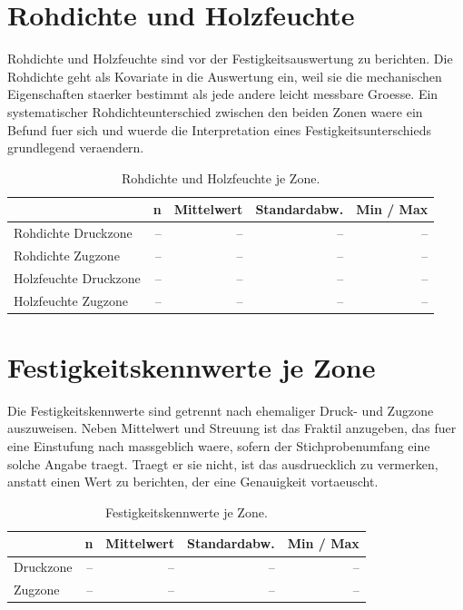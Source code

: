 \section{Rohdichte und Holzfeuchte}
\label{sec:density-moisture}

Rohdichte und Holzfeuchte sind vor der Festigkeitsauswertung zu berichten. Die
Rohdichte geht als Kovariate in die Auswertung ein, weil sie die mechanischen
Eigenschaften staerker bestimmt als jede andere leicht messbare Groesse. Ein
systematischer Rohdichteunterschied zwischen den beiden Zonen waere ein
Befund fuer sich und wuerde die Interpretation eines Festigkeitsunterschieds
grundlegend veraendern.

\begin{table}[H]
\centering
\caption{Rohdichte und Holzfeuchte je Zone.}
\label{tab:density}
\begin{tabular}{@{}lrrrr@{}}
\toprule
& \textbf{n} & \textbf{Mittelwert} & \textbf{Standardabw.}
& \textbf{Min / Max} \\
\midrule
Rohdichte Druckzone     & -- & -- & -- & -- \\
Rohdichte Zugzone       & -- & -- & -- & -- \\
Holzfeuchte Druckzone   & -- & -- & -- & -- \\
Holzfeuchte Zugzone     & -- & -- & -- & -- \\
\bottomrule
\end{tabular}
\end{table}

\section{Festigkeitskennwerte je Zone}
\label{sec:strength-results}

Die Festigkeitskennwerte sind getrennt nach ehemaliger Druck- und Zugzone
auszuweisen. Neben Mittelwert und Streuung ist das Fraktil anzugeben, das fuer
eine Einstufung nach \parencite{en384} massgeblich waere, sofern der
Stichprobenumfang eine solche Angabe traegt. Traegt er sie nicht, ist das
ausdruecklich zu vermerken, anstatt einen Wert zu berichten, der eine
Genauigkeit vortaeuscht.

\begin{table}[H]
\centering
\caption{Festigkeitskennwerte je Zone.}
\label{tab:strength}
\begin{tabular}{@{}lrrrr@{}}
\toprule
& \textbf{n} & \textbf{Mittelwert} & \textbf{Standardabw.}
& \textbf{Min / Max} \\
\midrule
Druckzone & -- & -- & -- & -- \\
Zugzone   & -- & -- & -- & -- \\
\bottomrule
\end{tabular}
\end{table}

